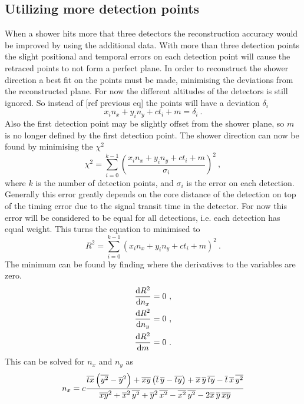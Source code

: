 \subsection{Utilizing more detection points}

When a shower hits more that three detectors the reconstruction accuracy would be improved by using the additional data. With more than three detection points the slight positional and temporal errors on each detection point will cause the retraced points to not form a perfect plane. In order to reconstruct the shower direction a best fit on the points must be made, minimising the deviations from the reconstructed plane. For now the different altitudes of the detectors is still ignored. So instead of [ref previous eq] the points will have a deviation $\delta_i$
%
\begin{equation}
    x_i n_x + y_i n_y + c t_i + m = \delta_i \ .
\end{equation}
%
Also the first detection point may be slightly offset from the shower plane, so $m$ is no longer defined by the first detection point. The shower direction can now be found by minimising the $\chi^2$
%
\begin{equation}
    \chi^2 = \sum_{i = 0}^{k - 1}
             \left(\frac{x_i n_x + y_i n_y + c t_i + m}
                        {\sigma_i} \right)^2 \ ,
\end{equation}
%
where $k$ is the number of detection points, and $\sigma_i$ is the error on each detection. Generally this error greatly depends on the core distance of the detection on top of the timing error due to the signal transit time in the detector. For now this error will be considered to be equal for all detections, i.e. each detection has equal weight. This turns the equation to minimised to
%
\begin{equation}
    R^2 = \sum_{i = 0}^{k - 1} \left(x_i n_x + y_i n_y + c t_i + m \right)^2 \ .
\end{equation}
%
The minimum can be found by finding where the derivatives to the variables are zero.
%
\begin{equation}
    \begin{aligned}
        \frac{\mathrm{d} R^2}{\mathrm{d} n_x} &= 0 \ , \\
        \frac{\mathrm{d} R^2}{\mathrm{d} n_y} &= 0 \ , \\
        \frac{\mathrm{d} R^2}{\mathrm{d} m} &= 0 \ .
    \end{aligned}
\end{equation}
%
This can be solved for $n_x$ and $n_y$ as
%
\begin{equation}\label{eq:regression_nx}
    n_x = c \frac{\overline{t x} \left( \overline{y^2} - \overline{y}^2 \right) +
                  \overline{x y} \left( \overline{t} \, \overline{y} - \overline{t y} \right) +
                  \overline{x} \, \overline{y} \, \overline{t y} -
                  \overline{t} \, \overline{x} \, \overline{y^2}}
                 {\overline{x y}^2 + \overline{x}^2 \, \overline{y^2} +
                  \overline{y}^2 \, \overline{x^2} - \overline{x^2} \, \overline{y^2} -
                  2 \overline{x} \, \overline{y} \, \overline{x y}}
\end{equation}
